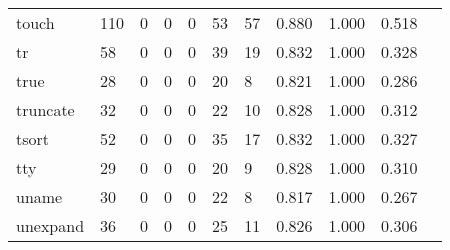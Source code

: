 \begin{longtable}{lp{1.10cm}p{1.10cm}p{1.10cm}p{1.10cm}p{1.10cm}p{1.10cm}p{1.10cm}p{1.10cm}p{1.10cm}p{1.10cm}}
touch     &                    110 &                                  0 &                                 0 &                                0 &                                53 &                              57 &                          0.880 &                                 1.000 &                               0.518 \\
tr        &                     58 &                                  0 &                                 0 &                                0 &                                39 &                              19 &                          0.832 &                                 1.000 &                               0.328 \\
true      &                     28 &                                  0 &                                 0 &                                0 &                                20 &                               8 &                          0.821 &                                 1.000 &                               0.286 \\
truncate  &                     32 &                                  0 &                                 0 &                                0 &                                22 &                              10 &                          0.828 &                                 1.000 &                               0.312 \\
tsort     &                     52 &                                  0 &                                 0 &                                0 &                                35 &                              17 &                          0.832 &                                 1.000 &                               0.327 \\
tty       &                     29 &                                  0 &                                 0 &                                0 &                                20 &                               9 &                          0.828 &                                 1.000 &                               0.310 \\
uname     &                     30 &                                  0 &                                 0 &                                0 &                                22 &                               8 &                          0.817 &                                 1.000 &                               0.267 \\
unexpand  &                     36 &                                  0 &                                 0 &                                0 &                                25 &                              11 &                          0.826 &                                 1.000 &                               0.306 \\

\end{longtable}
